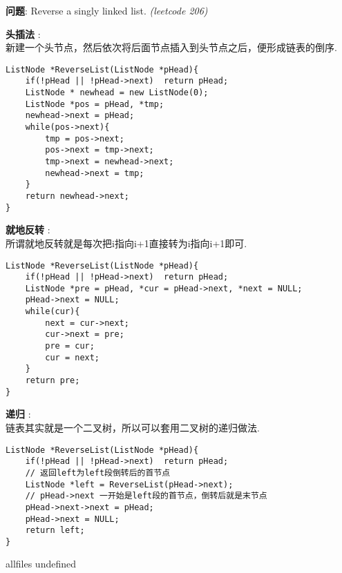 \documentclass{article}
\begin{document}
\begin{CJK}{UTF8}{gbsn}     %

\else
    
\begin{description}
    \item{\textbf{问题}}: Reverse a singly linked list. \textit{(leetcode 206)}
    \item{\textbf{头插法}} : 
    \\新建一个头节点，然后依次将后面节点插入到头节点之后，便形成链表的倒序.
    \begin{lstlisting}
ListNode *ReverseList(ListNode *pHead){
	if(!pHead || !pHead->next)	return pHead;
	ListNode * newhead = new ListNode(0);
	ListNode *pos = pHead, *tmp;
	newhead->next = pHead;
	while(pos->next){
		tmp = pos->next;
		pos->next = tmp->next;
		tmp->next = newhead->next;
		newhead->next = tmp;
	}
	return newhead->next;
}
    \end{lstlisting}
    \item{\textbf{就地反转}} : 
	\\所谓就地反转就是每次把i指向i+1直接转为i指向i+1即可.
	\begin{lstlisting}
ListNode *ReverseList(ListNode *pHead){
	if(!pHead || !pHead->next)	return pHead;
	ListNode *pre = pHead, *cur = pHead->next, *next = NULL;
	pHead->next = NULL;
	while(cur){
		next = cur->next;
		cur->next = pre;
		pre = cur;
		cur = next;
	}
	return pre;
}
	\end{lstlisting}
    \item{\textbf{递归}} : 
	\\链表其实就是一个二叉树，所以可以套用二叉树的递归做法.
	\begin{lstlisting}
ListNode *ReverseList(ListNode *pHead){
	if(!pHead || !pHead->next)	return pHead;
	// 返回left为left段倒转后的首节点
	ListNode *left = ReverseList(pHead->next); 
	// pHead->next 一开始是left段的首节点，倒转后就是末节点
	pHead->next->next = pHead; 
	pHead->next = NULL;
	return left;
}
	\end{lstlisting}
\end{description}

\fi

\ifx allfiles undefined
\end{CJK}
\end{document}

